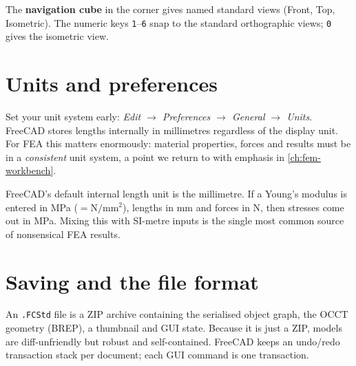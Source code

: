 The \textbf{navigation cube} in the corner gives named standard views
(Front, Top, Isometric). The numeric keys \texttt{1}--\texttt{6} snap to
the standard orthographic views; \texttt{0} gives the isometric view.

\section{Units and preferences}

Set your unit system early: \emph{Edit $\rightarrow$ Preferences
$\rightarrow$ General $\rightarrow$ Units}. FreeCAD stores lengths
internally in millimetres regardless of the display unit. For FEA this
matters enormously: material properties, forces and results must be in a
\emph{consistent} unit system, a point we return to with emphasis in
\cref{ch:fem-workbench}.

\begin{fcwarn}
FreeCAD's default internal length unit is the millimetre. If a Young's
modulus is entered in \si{\mega\pascal} ($=\si{\newton\per\milli\metre\squared}$),
lengths in \si{\milli\metre} and forces in \si{\newton}, then stresses
come out in \si{\mega\pascal}. Mixing this with SI-metre inputs is the
single most common source of nonsensical FEA results.
\end{fcwarn}

\section{Saving and the file format}

An \texttt{.FCStd} file is a ZIP archive containing the serialised
object graph, the OCCT geometry (BREP), a thumbnail and GUI state.
Because it is just a ZIP, models are diff-unfriendly but robust and
self-contained. FreeCAD keeps an undo/redo transaction stack per
document; each GUI command is one transaction.
